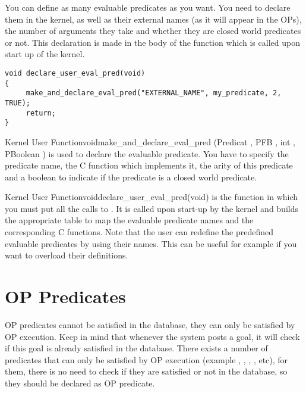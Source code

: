 You can define as many evaluable predicates as you want. You need to
declare them in the kernel, as well as their external names (as it will
appear in the OPs), the number of arguments they take and whether they are
closed world predicates or not. This declaration is made in the body of
the  function which is called upon start up
of the kernel.

\begin{verbatim}
void declare_user_eval_pred(void)
{
     make_and_declare_eval_pred("EXTERNAL_NAME", my_predicate, 2, TRUE);
     return;
}
\end{verbatim}

\begin{typefn}{Kernel User Function}{void}{make\_and\_declare\_eval\_pred}
        {(Predicat , PFB , int , PBoolean )}
is used to declare the evaluable predicate. You have to specify the
predicate name, the C function which implements it, the arity of this
predicate and a boolean to indicate if the predicate is a closed world
predicate.
\end{typefn}

\begin{typefn}{Kernel User Function}{void}{declare\_user\_eval\_pred}{(void)} 
is the function in which you must put all the calls to
. It is called upon start-up by the kernel and
builds the appropriate table to map the evaluable predicate names and the
corresponding C functions. Note that the user can redefine the predefined
evaluable predicates by using their names. This can be useful for example if
you want to overload their definitions.
\end{typefn}

\section{OP Predicates}

OP predicates cannot be satisfied in the database, they
can only be satisfied by OP execution. Keep in mind that whenever the system
posts a goal, it will check if this goal is already satisfied in the database.
There exists a number of predicates that can only be satisfied by OP execution
(example , ,
, , etc), for them, there is no need to
check if they are satisfied or not in the database, so they should be declared
as OP predicate. 

